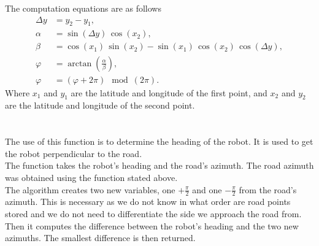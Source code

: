             The computation equations are as follows
            \begin{align}
                \Delta y &= y_{2} - y_{1}, \\
                \alpha &= \sin{(\Delta y)}\,\cos{(x_{2})}, \\
                \beta &= \cos{(x_{1})}\,\sin{(x_{2})} - \sin{(x_{1})}\,\cos{(x_{2})}\,\cos{(\Delta y)}, \\
                \varphi &= \arctan{\left(\frac{\alpha}{\beta}\right)}, \\
                \varphi &= (\varphi + 2\pi) \mod (2\pi).
            \end{align}
            Where $x_{1}$ and $y_{1}$ are the latitude and longitude of the first point, and $x_{2}$ and $y_{2}$ are the latitude and longitude of the second point.\\\\
        \\
            The use of this function is to determine the heading of the robot. It is used to get the robot perpendicular to the road.\\
            The function takes the robot's heading and the road's azimuth. The road azimuth was obtained using the function stated above.\\
            The algorithm creates two new variables, one $+\frac{\pi}{2}$ and one $-\frac{\pi}{2}$ from the road's azimuth. This is necessary as we do not know in what order are road points stored and we do not need to differentiate the side we approach the road from.\\
            Then it computes the difference between the robot's heading and the two new azimuths. The smallest difference is then returned.
    
